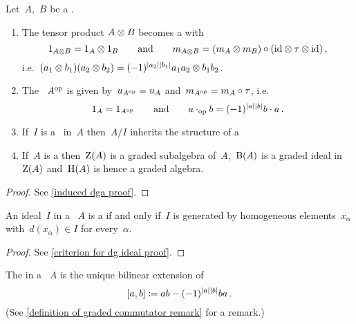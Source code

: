 \documentclass[a4paper,10pt,headings=standardclasses]{scrartcl}
\begin{document}
\begin{proposition}
  \label{induced dga}
  Let~$A$,~$B$ be a {\dgas}.
  \begin{enumerate}
    \item
      The tensor product $A \otimes B$ becomes a {\dga} with
      \[
        1_{A \otimes B} = 1_A \otimes 1_B
        \qquad\text{and}\qquad
        m_{A \otimes B} = (m_A \otimes m_B) \circ ({\operatorname{id}} \otimes \tau \otimes {\operatorname{id}}) \,,
      \]
      i.e.~$(a_1 \otimes b_1) (a_2 \otimes b_2) = (-1)^{\lvert a_2\rvert \lvert b_1\rvert} a_1 a_2 \otimes b_1 b_2$.
    \item
      The {\dga}~$A^{\mathrm{op}}$ is given by~$u_{A^{\mathrm{op}}} = u_A$ and~$m_{A^{\mathrm{op}}} = m_A \circ \tau$, i.e.
      \[
        1_A
        =
        1_{A^{\mathrm{op}}}
        \qquad\text{and}\qquad
        a \cdot_{\mathrm{op}} b
        =
        (-1)^{\lvert a\rvert \lvert b\rvert} b \cdot a \,.
      \]
    \item
      If~$I$ is a~{\dgi} in~$A$ then~$A/I$ inherits the structure of a {\dga}
    \item
      If~$A$ is a {\dga} then~$\operatorname{Z}(A)$ is a graded subalgebra of~$A$,~$\operatorname{B}(A)$ is a graded ideal in~$\operatorname{Z}(A)$ and~$\operatorname{H}(A)$ is hence a graded algebra.
  \end{enumerate}
\end{proposition}

\begin{proof}
  See \cref{induced dga proof}.
\end{proof}

\begin{lemma}
  \label{criterion for dg ideal}
  An ideal~$I$ in a {\dga}~$A$ is a {\dgi} if and only if~$I$ is generated by homogeneous elements~$x_\alpha$ with~$d(x_\alpha) \in I$ for every~$\alpha$.
\end{lemma}

\begin{proof}
  See \cref{criterion for dg ideal proof}.
\end{proof}

\begin{definition}
  \label{definition of graded commutator}
  The  in a {\dga}~$A$ is the unique bilinear extension of
  \[
    [a,b]
    \coloneqq
    ab - (-1)^{\lvert a\rvert\lvert b\rvert} ba \,.
  \]
  (See \cref{definition of graded commutator remark} for a remark.)
\end{definition}
\end{document}
